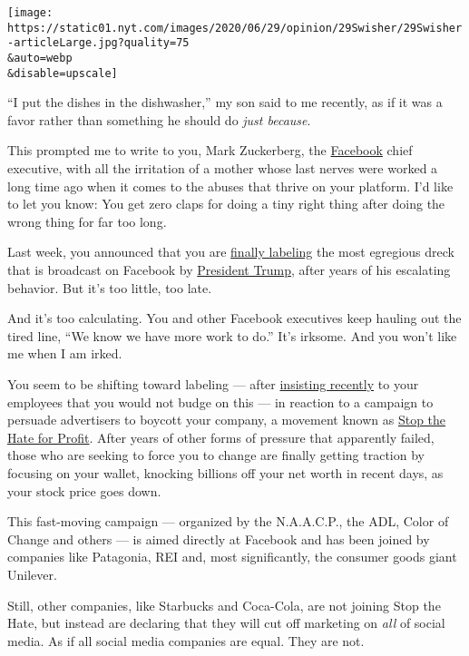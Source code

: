 \texttt{[image: https://static01.nyt.com/images/2020/06/29/opinion/29Swisher/29Swisher-articleLarge.jpg?quality=75\\\&auto=webp\\\&disable=upscale]}

``I put the dishes in the dishwasher,'' my son said to me recently, as
if it was a favor rather than something he should do \emph{just
because}.

This prompted me to write to you, Mark Zuckerberg, the
\href{https://www.nytimes.com/2020/06/30/us/politics/brad-parscale-trump.html}{Facebook}
chief executive, with all the irritation of a mother whose last nerves
were worked a long time ago when it comes to the abuses that thrive on
your platform. I'd like to let you know: You get zero claps for doing a
tiny right thing after doing the wrong thing for far too long.

Last week, you announced that you are
\href{https://www.nytimes.com/2020/06/26/technology/facebook-labels-advertisers.html}{finally
labeling} the most egregious dreck that is broadcast on Facebook by
\href{https://www.nytimes.com/2020/06/30/us/politics/brad-parscale-trump.html}{President
Trump}, after years of his escalating behavior. But it's too little, too
late.

And it's too calculating. You and other Facebook executives keep hauling
out the tired line, ``We know we have more work to do.'' It's irksome.
And you won't like me when I am irked.

You seem to be shifting toward labeling --- after
\href{https://www.nytimes.com/2020/06/02/technology/zuckerberg-defends-facebook-trump-posts.html}{insisting
recently} to your employees that you would not budge on this --- in
reaction to a campaign to persuade advertisers to boycott your company,
a movement known as \href{https://www.stophateforprofit.org/}{Stop the
Hate for Profit}. After years of other forms of pressure that apparently
failed, those who are seeking to force you to change are finally getting
traction by focusing on your wallet, knocking billions off your net
worth in recent days, as your stock price goes down.

This fast-moving campaign --- organized by the N.A.A.C.P., the ADL,
Color of Change and others --- is aimed directly at Facebook and has
been joined by companies like Patagonia, REI and, most significantly,
the consumer goods giant Unilever.

Still, other companies, like Starbucks and Coca-Cola, are not joining
Stop the Hate, but instead are declaring that they will cut off
marketing on \emph{all} of social media. As if all social media
companies are equal. They are not.

